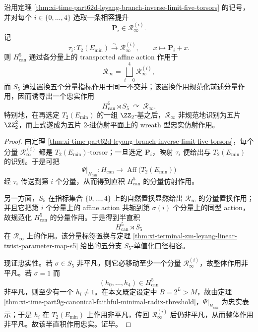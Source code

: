 \begin{theorem}\label{thm:xi-time-part62d-leyang-branch-wreath-affine}
沿用定理 \ref{thm:xi-time-part62d-leyang-branch-inverse-limit-five-torsors} 的记号，并对每个 \(i\in\{0,\dots,4\}\) 选取一条相容提升
\[
\mathbf P_i\in \mathcal R_\infty^{(i)}.
\]
记
\[
\tau_i:T_2(E_{\min})\stackrel{\sim}{\longrightarrow}\mathcal R_\infty^{(i)},
\qquad
x\longmapsto \mathbf P_i+x.
\]
则 \(H_{\mathrm{can}}^{5}\) 通过各分量上的 transported affine action 作用于
\[
\mathcal R_\infty=\bigsqcup_{i=0}^{4}\mathcal R_\infty^{(i)},
\]
而 \(S_5\) 通过置换五个分量指标作用于同一不交并；该置换作用规范化前述分量作用，因而诱导出一个忠实作用
\[
H_{\mathrm{can}}^{5}\rtimes S_5\ \curvearrowright\ \mathcal R_\infty.
\]
特别地，在再选定 \(T_2(E_{\min})\) 的一组 \(\ZZ_2\)-基之后，\(\mathcal R_\infty\) 非规范地识别为五片 \(\ZZ_2^2\)，而上式遂成为五片 \(2\)-进仿射平面上的 wreath 型忠实仿射作用。
\end{theorem}
\begin{proof}
由定理 \ref{thm:xi-time-part62d-leyang-branch-inverse-limit-five-torsors}，每个分量 \(\mathcal R_\infty^{(i)}\) 都是 \(T_2(E_{\min})\)-torsor；一旦选定 \(\mathbf P_i\)，映射 \(\tau_i\) 便给出与 \(T_2(E_{\min})\) 的识别。于是可把
\[
\Psi|_{H_{\mathrm{can}}}:H_{\mathrm{can}}\to \operatorname{Aff}\bigl(T_2(E_{\min})\bigr)
\]
经 \(\tau_i\) 传送到第 \(i\) 个分量，从而得到直积 \(H_{\mathrm{can}}^{5}\) 的分量仿射作用。

另一方面，\(S_5\) 在指标集合 \(\{0,\dots,4\}\) 上的自然置换显然给出 \(\mathcal R_\infty\) 的分量置换作用；并且它把第 \(i\) 个分量上的 affine action 共轭到第 \(\sigma(i)\) 个分量上的同型 action，故规范化 \(H_{\mathrm{can}}^{5}\) 的分量作用。于是得到半直积
\[
H_{\mathrm{can}}^{5}\rtimes S_5
\]
在 \(\mathcal R_\infty\) 上的作用。该分量标签置换与定理 \ref{thm:xi-terminal-zm-leyang-linear-twist-parameter-map-s5} 给出的五分支 \(S_5\)-单值化口径相容。

现证忠实性。若 \(\sigma\in S_5\) 非平凡，则它必移动至少一个分量 \(\mathcal R_\infty^{(i)}\)，故整体作用非平凡。若 \(\sigma=1\) 而
\[
(h_0,\dots,h_4)\in H_{\mathrm{can}}^{5}
\]
非平凡，则至少有一个 \(h_i\neq 1\)。在本文既定设定中 \(B=2^L>M\)，故由定理 \ref{thm:xi-time-part9g-canonical-faithful-minimal-radix-threshold}，\(\Psi|_{H_{\mathrm{can}}}\) 为忠实表示；于是 \(h_i\) 在 \(T_2(E_{\min})\) 上作用非平凡，传回 \(\mathcal R_\infty^{(i)}\) 后仍非平凡，从而整体作用非平凡。故该半直积作用忠实。证毕。
\end{proof}

